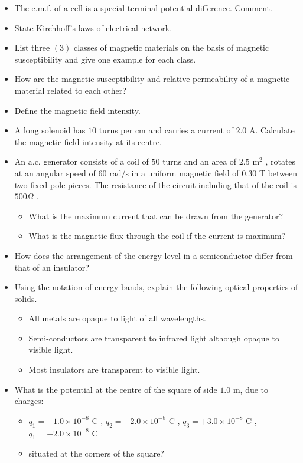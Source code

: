 \documentclass{article}
\begin{document}
\begin{itemize}
\item The e.m.f. of a cell is a special terminal potential difference.  Comment.
\item State Kirchhoff's laws of electrical network.
\item List three $ (3)$ classes of magnetic materials on the basis of magnetic susceptibility and give one example for each class.
\item How are the magnetic susceptibility and relative permeability of a magnetic material related to each other?
\item Define the magnetic field intensity.
\item A long solenoid has $ 10$ turns per cm and carries a current of $ 2.0$ A.  Calculate the magnetic field intensity at its centre.
\item An a.c. generator consists of a coil of $ 50$ turns and an area of $ 2.5$ m$ ^{2}$ , rotates at an angular speed of $ 60$ rad$/$s in a uniform magnetic field of $ 0.30$ T between two fixed pole pieces.  The resistance of the circuit including that of the coil is $ 500\Omega $ .  
 \begin{itemize}
\item  What is the maximum current that can be drawn from the generator?
\item  What is the magnetic flux through the coil if the current is maximum?
\end{itemize}
\item How does the arrangement of the energy level in a semiconductor differ from that of an insulator?
\item Using the notation of energy bands, explain the following optical properties of solids.
 \begin{itemize}
\item  All metals are opaque to light of all wavelengths.
\item  Semi-conductors are transparent to infrared light although opaque to visible light.
\item  Most insulators are transparent to visible light.
\end{itemize}
\item What is the potential at the centre of the square of side $ 1.0$ m, due to charges:
 \begin{itemize}
\item $ q_{1}=+1.0\times10^{-8}$ C , $ q_{2}=-2.0\times10^{-8}$ C , $ q_{3}=+3.0\times10^{-8}$ C , $ q_{1}= +2.0\times10^{-8}$ C
\item situated at the corners of the square?

\end{itemize}
\end{itemize}
\end{document}
